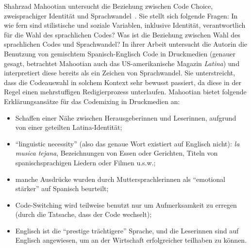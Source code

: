 Shahrzad Mahootian untersucht die Beziehung zwischen Code Choice, zweisprachiger Identität und Sprachwandel~\cite[]{Mahootian05}.
Sie stellt sich folgende Fragen: In wie fern sind stilistische und soziale Variablen, inklusive Identität, verantwortlich für die Wahl des sprachlichen Codes?
Was ist die Beziehung zwischen Wahl des sprachlichen Codes und Sprachwandel?
In ihrer Arbeit untersucht die Autorin die Benutzung von gemischtem Spanisch-Englisch Code in Druckmedien (genauer gesagt, betrachtet Mahootian auch das US-amerikanische Magazin \textit{Latina}) und interpretiert diese bereits als ein Zeichen von Sprachwandel.
Sie unterstreicht, dass die Codeauswahl in solchem Kontext sehr bewusst passiert, da diese in der Regel einen mehrstuffigen Redigierprozess unterlaufen.
Mahootian bietet folgende Erklärungsansätze für das Codemixing in Druckmedien an:
\begin{itemize}
  \item Schaffen einer Nähe zwischen Herausgeberinnen und Leserinnen, aufgrund von einer geteilten Latina-Identität;
  \item ``linguistic necessity'' (also das genaue Wort existiert auf Englisch nicht): \textit{la musica tejana}, Bezeichnungen von Essen oder Gerichten, Titeln von spanischsprachigen Liedern oder Filmen u.s.w.;
  \item manche Ausdrücke wurden durch Muttersprachlerinnen als ``emotional stärker'' auf Spanisch beurteilt;
  \item Code-Switching wird teilweise benutzt nur um Aufmerksamkeit zu erregen (durch die Tatsache, dass der Code wechselt);
  \item Englisch ist die ``prestige trächtigere'' Sprache, und die Leserinnen sind auf Englisch angewiesen, um an der Wirtschaft erfolgreicher teilhaben zu können.
\end{itemize}



